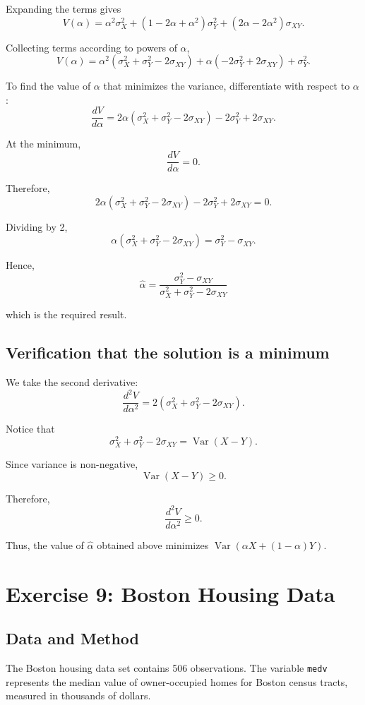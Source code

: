 \documentclass[12pt,a4paper]{article}
\begin{document}
Expanding the terms gives
\[
V(\alpha)
=
\alpha^2\sigma_X^2
+
(1-2\alpha+\alpha^2)\sigma_Y^2
+
(2\alpha-2\alpha^2)\sigma_{XY}.
\]

Collecting terms according to powers of $\alpha$,
\[
V(\alpha)
=
\alpha^2
(\sigma_X^2+\sigma_Y^2-2\sigma_{XY})
+
\alpha(-2\sigma_Y^2+2\sigma_{XY})
+
\sigma_Y^2.
\]

To find the value of $\alpha$ that minimizes the variance, differentiate
with respect to $\alpha$:
\[
\frac{dV}{d\alpha}
=
2\alpha(\sigma_X^2+\sigma_Y^2-2\sigma_{XY})
-2\sigma_Y^2+2\sigma_{XY}.
\]

At the minimum,
\[
\frac{dV}{d\alpha}=0.
\]

Therefore,
\[
2\alpha(\sigma_X^2+\sigma_Y^2-2\sigma_{XY})
-2\sigma_Y^2+2\sigma_{XY}=0.
\]

Dividing by 2,
\[
\alpha(\sigma_X^2+\sigma_Y^2-2\sigma_{XY})
=
\sigma_Y^2-\sigma_{XY}.
\]

Hence,
\[
\boxed{
\hat{\alpha}
=
\frac{\sigma_Y^2-\sigma_{XY}}
{\sigma_X^2+\sigma_Y^2-2\sigma_{XY}}
}
\]

which is the required result.

\subsection*{Verification that the solution is a minimum}

We take the second derivative:
\[
\frac{d^2V}{d\alpha^2}
=
2(\sigma_X^2+\sigma_Y^2-2\sigma_{XY}).
\]

Notice that
\[
\sigma_X^2+\sigma_Y^2-2\sigma_{XY}
=
\operatorname{Var}(X-Y).
\]

Since variance is non-negative,
\[
\operatorname{Var}(X-Y)\geq 0.
\]

Therefore,
\[
\frac{d^2V}{d\alpha^2}\geq 0.
\]

Thus, the value of $\hat{\alpha}$ obtained above minimizes
$\operatorname{Var}(\alpha X+(1-\alpha)Y)$.

\section{Exercise 9: Boston Housing Data}

\subsection*{Data and Method}

The Boston housing data set contains 506 observations. The variable
\texttt{medv} represents the median value of owner-occupied homes for
Boston census tracts, measured in thousands of dollars.
\end{document}
